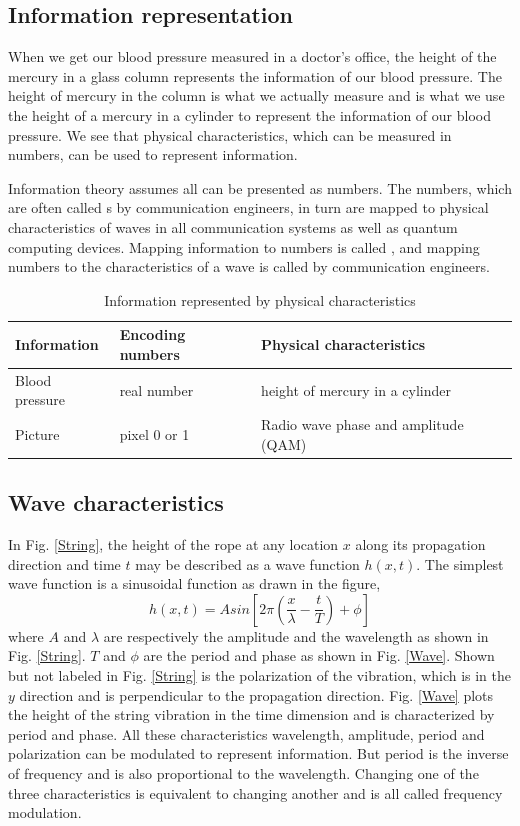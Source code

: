 \documentclass[Letter,11pt]{book}
\begin{document}
\subsection{Information representation}
When we get our blood pressure measured in a doctor's office, the height of the mercury in a glass column represents the information of our blood pressure. The height of mercury in the column is what we actually measure and is what we use the height of a mercury in a cylinder to represent the information of our blood pressure. We see that physical characteristics, which can be measured in numbers, can be used to represent information.

Information theory assumes all  can be presented as numbers. The numbers, which are often called s by communication engineers, in turn are mapped to physical characteristics of waves in all communication systems as well as quantum computing devices. Mapping information to numbers is called , and mapping numbers to the characteristics of a wave is called  by communication engineers.

\begin{table}[]
\label{information-characteristics}
\begin{tabular}{|l|l|l|}
\hline
Information & Encoding numbers & Physical characteristics  \\ \hline
Blood pressure & real number & height of mercury in a cylinder \\ \hline
Picture & pixel 0 or 1 & Radio wave phase and amplitude (QAM) \\ \hline
\end{tabular}
\caption{Information represented by physical characteristics}
\end{table}

\subsection{Wave characteristics}
In Fig. \ref{String}, the height of the rope at any location $x$ along its propagation direction and time $t$ may be described as a wave function $h(x,t)$. The simplest wave function is a sinusoidal function as drawn in the figure,
\begin{equation}
    h(x,t) = A sin[2\pi (\frac x \lambda - \frac t T) +\phi]
\end{equation}
where $A$ and $\lambda$ are respectively the amplitude and the wavelength as shown in Fig. \ref{String}. $T$ and $\phi$ are the period and phase as shown in Fig. \ref{Wave}. Shown but not labeled in Fig. \ref{String} is the polarization of the vibration, which is in the $y$ direction and is perpendicular to the propagation direction. Fig. \ref{Wave} plots the height of the string vibration in the time dimension and is characterized by period and phase. All these characteristics wavelength, amplitude, period and polarization can be modulated to represent information. But period is the inverse of frequency and is also proportional to the wavelength. Changing one of the three characteristics is equivalent to changing another and is all called frequency modulation.
\end{document}
